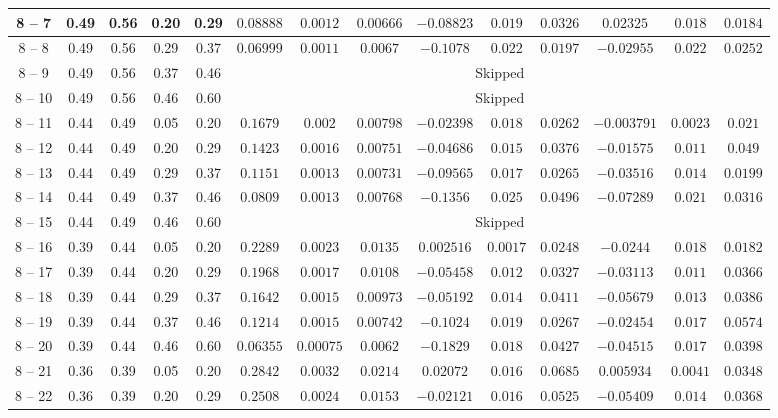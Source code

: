 \begin{longtable}{|*{14}{c|}}
8 -- 7 & 0.49 & 0.56 & 0.20 & 0.29 & $0.08888$ & $0.0012$ & $0.00666$ & $-0.08823$ & $0.019$ & $0.0326$ & $0.02325$ & $0.018$ & $0.0184$ \\
\hline
8 -- 8 & 0.49 & 0.56 & 0.29 & 0.37 & $0.06999$ & $0.0011$ & $0.0067$ & $-0.1078$ & $0.022$ & $0.0197$ & $-0.02955$ & $0.022$ & $0.0252$ \\
\hline
8 -- 9 & 0.49 & 0.56 & 0.37 & 0.46 & \multicolumn{9}{c|}{Skipped} \\
\hline
8 -- 10 & 0.49 & 0.56 & 0.46 & 0.60 & \multicolumn{9}{c|}{Skipped} \\
\hline
8 -- 11 & 0.44 & 0.49 & 0.05 & 0.20 & $0.1679$ & $0.002$ & $0.00798$ & $-0.02398$ & $0.018$ & $0.0262$ & $-0.003791$ & $0.0023$ & $0.021$ \\
\hline
8 -- 12 & 0.44 & 0.49 & 0.20 & 0.29 & $0.1423$ & $0.0016$ & $0.00751$ & $-0.04686$ & $0.015$ & $0.0376$ & $-0.01575$ & $0.011$ & $0.049$ \\
\hline
8 -- 13 & 0.44 & 0.49 & 0.29 & 0.37 & $0.1151$ & $0.0013$ & $0.00731$ & $-0.09565$ & $0.017$ & $0.0265$ & $-0.03516$ & $0.014$ & $0.0199$ \\
\hline
8 -- 14 & 0.44 & 0.49 & 0.37 & 0.46 & $0.0809$ & $0.0013$ & $0.00768$ & $-0.1356$ & $0.025$ & $0.0496$ & $-0.07289$ & $0.021$ & $0.0316$ \\
\hline
8 -- 15 & 0.44 & 0.49 & 0.46 & 0.60 & \multicolumn{9}{c|}{Skipped} \\
\hline
8 -- 16 & 0.39 & 0.44 & 0.05 & 0.20 & $0.2289$ & $0.0023$ & $0.0135$ & $0.002516$ & $0.0017$ & $0.0248$ & $-0.0244$ & $0.018$ & $0.0182$ \\
\hline
8 -- 17 & 0.39 & 0.44 & 0.20 & 0.29 & $0.1968$ & $0.0017$ & $0.0108$ & $-0.05458$ & $0.012$ & $0.0327$ & $-0.03113$ & $0.011$ & $0.0366$ \\
\hline
8 -- 18 & 0.39 & 0.44 & 0.29 & 0.37 & $0.1642$ & $0.0015$ & $0.00973$ & $-0.05192$ & $0.014$ & $0.0411$ & $-0.05679$ & $0.013$ & $0.0386$ \\
\hline
8 -- 19 & 0.39 & 0.44 & 0.37 & 0.46 & $0.1214$ & $0.0015$ & $0.00742$ & $-0.1024$ & $0.019$ & $0.0267$ & $-0.02454$ & $0.017$ & $0.0574$ \\
\hline
8 -- 20 & 0.39 & 0.44 & 0.46 & 0.60 & $0.06355$ & $0.00075$ & $0.0062$ & $-0.1829$ & $0.018$ & $0.0427$ & $-0.04515$ & $0.017$ & $0.0398$ \\
\hline
8 -- 21 & 0.36 & 0.39 & 0.05 & 0.20 & $0.2842$ & $0.0032$ & $0.0214$ & $0.02072$ & $0.016$ & $0.0685$ & $0.005934$ & $0.0041$ & $0.0348$ \\
\hline
8 -- 22 & 0.36 & 0.39 & 0.20 & 0.29 & $0.2508$ & $0.0024$ & $0.0153$ & $-0.02121$ & $0.016$ & $0.0525$ & $-0.05409$ & $0.014$ & $0.0368$ \\

\end{longtable}
